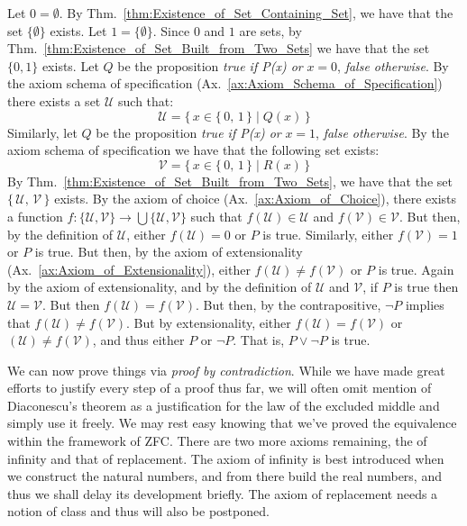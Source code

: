         \begin{bproof}
            Let $0=\emptyset$. By
            Thm.~\ref{thm:Existence_of_Set_Containing_Set}, we have that the set
            $\{\emptyset\}$ exists. Let $1=\{\emptyset\}$. Since $0$ and $1$ are
            sets, by Thm.~\ref{thm:Existence_of_Set_Built_from_Two_Sets} we have
            that the set $\{0,1\}$ exists. Let $Q$ be the proposition
            \textit{true if P(x) or }$x=0$, \textit{false otherwise}. By the
            axiom schema of specification
            (Ax.~\ref{ax:Axiom_Schema_of_Specification}) there exists a set
            $\mathcal{U}$ such that:
            \begin{equation}
                \mathcal{U}=\{\,x\in\{\,0,\,1\,\}\;|\;Q(x)\,\}
            \end{equation}
            Similarly, let $Q$ be the proposition \textit{true if P(x) or}
            $x=1$, \textit{false otherwise}. By the axiom schema of
            specification we have that the following set exists:
            \begin{equation}
                \mathcal{V}=\{\,x\in\{\,0,\,1\,\}\;|\;R(x)\,\}
            \end{equation}
            By Thm.~\ref{thm:Existence_of_Set_Built_from_Two_Sets}, we have that
            the set $\{\,\mathcal{U},\,\mathcal{V}\,\}$ exists. By the axiom of
            choice (Ax.~\ref{ax:Axiom_of_Choice}), there exists a function
            $f:\{\mathcal{U},\mathcal{V}\}\rightarrow%
             \bigcup\{\mathcal{U},\mathcal{V}\}$ such that
            $f(\mathcal{U})\in\mathcal{U}$ and $f(\mathcal{V})\in\mathcal{V}$.
            But then, by the definition of $\mathcal{U}$, either
            $f(\mathcal{U})=0$ or $P$ is true. Similarly, either
            $f(\mathcal{V})=1$ or $P$ is true. But then, by the axiom of
            extensionality (Ax.~\ref{ax:Axiom_of_Extensionality}), either
            $f(\mathcal{U})\ne{f}(\mathcal{V})$ or $P$ is true. Again by the
            axiom of extensionality, and by the definition of $\mathcal{U}$ and
            $\mathcal{V}$, if $P$ is true then $\mathcal{U}=\mathcal{V}$. But
            then $f(\mathcal{U})=f(\mathcal{V})$. But then, by the
            contrapositive, $\neg{P}$ implies that
            $f(\mathcal{U})\ne{f}(\mathcal{V})$. But by extensionality, either
            $f(\mathcal{U})=f(\mathcal{V})$ or
            $(\mathcal{U})\ne{f}(\mathcal{V})$, and thus either $P$ or
            $\neg{P}$. That is, $P\lor\neg{P}$ is true.
        \end{bproof}
        We can now prove things via \textit{proof by contradiction}. While we
        have made great efforts to justify every step of a proof thus far, we
        will often omit mention of Diaconescu's theorem as a justification for
        the law of the excluded middle and simply use it freely. We may rest
        easy knowing that we've proved the equivalence within the framework of
        ZFC. There are two more axioms remaining, the of infinity and that of
        replacement. The axiom of infinity is best introduced when we construct
        the natural numbers, and from there build the real numbers, and thus we
        shall delay its development briefly. The axiom of replacement needs a
        notion of class and thus will also be postponed.